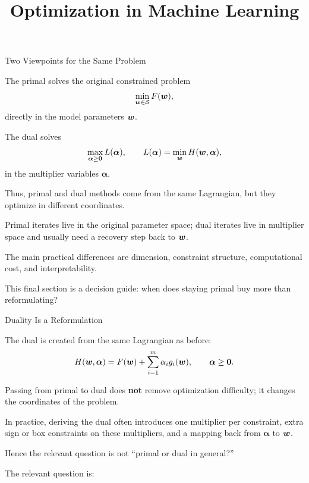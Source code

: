 \documentclass[11pt,compress,t,notes=noshow, xcolor=table]{beamer}
\title{Optimization in Machine Learning}
\newcommand{\alphav}{\bm{\alpha}}
\begin{document}

\begin{framei}[fs=small]{Two Viewpoints for the Same Problem}
\item The primal solves the original constrained problem
$$
\min_{\bm{w} \in \mathcal{S}} F(\bm{w}),
$$
directly in the model parameters $\bm{w}$.
\item The dual solves
$$
\max_{\alphav \ge \zero} L(\alphav),
\qquad
L(\alphav)=\min_{\wv} H(\wv,\alphav),
$$
in the multiplier variables $\alphav$.
\item Thus, primal and dual methods come from the same Lagrangian, but they optimize in different coordinates.
\item Primal iterates live in the original parameter space; dual iterates live in multiplier space and usually need a recovery step back to $\bm{w}$.
\item The main practical differences are dimension, constraint structure, computational cost, and interpretability.
\item This final section is a decision guide: when does staying primal buy more than reformulating?
\end{framei}


\begin{framei}[fs=small]{Duality Is a Reformulation}
\item The dual is created from the same Lagrangian as before:
$$
H(\wv,\alphav) = F(\wv) + \sum_{i=1}^m \alpha_i g_i(\wv),
\qquad
\alphav \ge \zero.
$$
\item Passing from primal to dual does \textbf{not} remove optimization difficulty; it changes the coordinates of the problem.
\item In practice, deriving the dual often introduces one multiplier per constraint, extra sign or box constraints on these multipliers, and a mapping back from $\alphav$ to $\bm{w}$.
\item Hence the relevant question is not \enquote{primal or dual in general?}
\item The relevant question is:
\end{framei}
\end{document}
